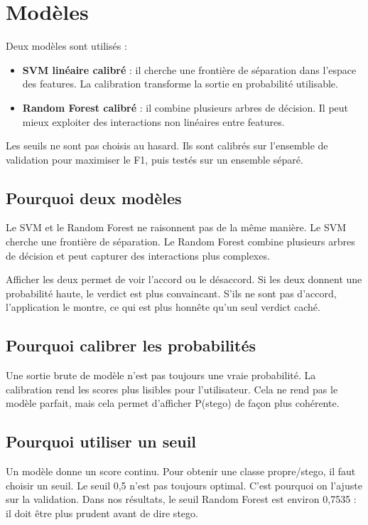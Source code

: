 \documentclass[11pt,a4paper]{article}
\begin{document}
\section{Modèles}
Deux modèles sont utilisés :
\begin{itemize}
  \item \textbf{SVM linéaire calibré} : il cherche une frontière de séparation dans l'espace des features. La calibration transforme la sortie en probabilité utilisable.
  \item \textbf{Random Forest calibré} : il combine plusieurs arbres de décision. Il peut mieux exploiter des interactions non linéaires entre features.
\end{itemize}

Les seuils ne sont pas choisis au hasard. Ils sont calibrés sur l'ensemble de validation pour maximiser le F1, puis testés sur un ensemble séparé.

\subsection*{Pourquoi deux modèles}
Le SVM et le Random Forest ne raisonnent pas de la même manière. Le SVM cherche une frontière de séparation. Le Random Forest combine plusieurs arbres de décision et peut capturer des interactions plus complexes.

Afficher les deux permet de voir l'accord ou le désaccord. Si les deux donnent une probabilité haute, le verdict est plus convaincant. S'ils ne sont pas d'accord, l'application le montre, ce qui est plus honnête qu'un seul verdict caché.

\subsection*{Pourquoi calibrer les probabilités}
Une sortie brute de modèle n'est pas toujours une vraie probabilité. La calibration rend les scores plus lisibles pour l'utilisateur. Cela ne rend pas le modèle parfait, mais cela permet d'afficher \og P(stego) \fg{} de façon plus cohérente.

\subsection*{Pourquoi utiliser un seuil}
Un modèle donne un score continu. Pour obtenir une classe propre/stego, il faut choisir un seuil. Le seuil 0,5 n'est pas toujours optimal. C'est pourquoi on l'ajuste sur la validation. Dans nos résultats, le seuil Random Forest est environ 0,7535 : il doit être plus prudent avant de dire stego.
\end{document}
